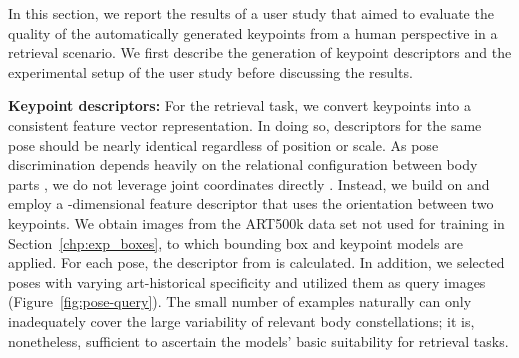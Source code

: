 \documentclass[sigconf]{acmart}
\begin{document}
In this section, we report the results of a user study that aimed to evaluate the quality of the automatically generated keypoints from a human perspective in a retrieval scenario. We first describe the generation of keypoint descriptors and the experimental setup of the user study before discussing the results.

\textbf{Keypoint descriptors:} For the retrieval task, we convert keypoints into a consistent feature vector representation. 
In doing so, descriptors for the same pose should be nearly identical regardless of position or scale. 
As pose discrimination depends heavily on the relational configuration between body parts \cite{DBLP:journals/tvcg/HoK09}, we do not leverage joint coordinates directly \cite{DBLP:journals/jvca/SoB05, DBLP:conf/humanoids/HaradaTMS04}. 
Instead, we build on \citet{DBLP:journals/tvcg/ChenZNYWX11}
and employ a -dimensional feature descriptor that uses the orientation between two keypoints. 
We obtain  images from the ART500k data set not used for training in Section~\ref{chp:exp_boxes}, to which bounding box and keypoint models are applied. 
For each pose, the descriptor from \citet{DBLP:journals/tvcg/ChenZNYWX11} is calculated. 
In addition, we selected  poses with varying art-historical specificity and utilized them as query images (Figure~\ref{fig:pose-query}). 
The small number of examples naturally can only inadequately cover the large variability of relevant body constellations; it is, nonetheless, sufficient to ascertain the models' basic suitability for retrieval tasks.
\end{document}
